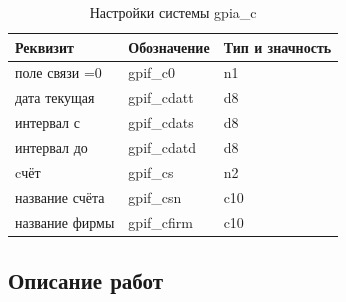 \begin{table}[h!p]
    \centering
    \scriptsize
    \caption{Настройки системы gpia\_c}
    \begin{tabular}{|l|l|l|} 

                                                                               \hline
\textbf{Реквизит}       &\textbf{Обозначение}   &\textbf{Тип и значность}   \\ \hline
поле связи          =0  &gpif\_c0               &n1                         \\ \hline
дата текущая            &gpif\_cdatt            &d8                         \\ \hline
интервал с              &gpif\_cdats            &d8                         \\ \hline
интервал до             &gpif\_cdatd            &d8                         \\ \hline
cчёт                    &gpif\_cs               &n2                         \\ \hline
название счёта          &gpif\_csn              &c10                        \\ \hline
название фирмы          &gpif\_cfirm            &c10                        \\ \hline

    \end{tabular}
\end{table}

\newpage

\subsection{Описание работ}

